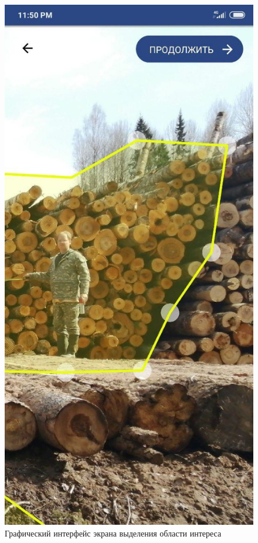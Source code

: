 \documentclass[14pt]{matmex-diploma-custom}
\begin{document}
\begin{figure}[h]
\centering
\includegraphics[scale=0.30]{areascreen.png}
\caption{Графический интерфейс экрана выделения области интереса}
\label{areascreen}
\end{figure}
\end{document}
